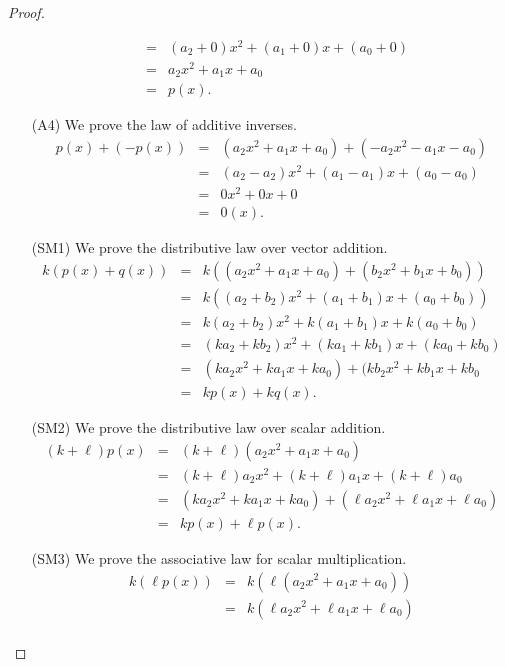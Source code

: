 \begin{proof}
\begin{itemize}
\begin{eqnarray*}
                   &=&  (a_2 + 0)x^2 + (a_1 + 0)x + (a_0 + 0) \\
                   &=&  a_2x^2 + a_1x + a_0 \\
                   &=&  p(x).
    \end{eqnarray*}
  \item[(A4)] We prove the law of additive inverses.
    \begin{eqnarray*}
      p(x) + (-p(x)) &=& (a_2x^2 + a_1x + a_0) + (- a_2x^2  - a_1x - a_0) \\
                     &=& (a_2 - a_2)x^2 + (a_1 - a_1)x + (a_0 - a_0) \\
                     &=& 0x^2 + 0x + 0 \\
                     &=& 0(x).
    \end{eqnarray*}
  \item[(SM1)] We prove the distributive law over vector addition.
    \begin{eqnarray*}
      k(p(x) + q(x)) &=& k ((a_2x^2 + a_1x + a_0) + (b_2x^2 + b_1x + b_0)) \\
                     &=& k ((a_2 + b_2)x^2 + (a_1 + b_1)x + (a_0 + b_0)) \\
                     &=& k(a_2 + b_2)x^2 + k(a_1 + b_1)x + k(a_0 + b_0) \\
                     &=& (ka_2 + kb_2)x^2 + (ka_1 + kb_1)x + (ka_0 + kb_0) \\
                     &=& (ka_2x^2 + ka_1x + ka_0) + (kb_2x^2 + kb_1x + kb_0 \\
                     &=& kp(x) + kq(x).
    \end{eqnarray*}
  \item[(SM2)] We prove the distributive law over scalar addition.
    \begin{eqnarray*}
      (k + \ell) p(x) &=& (k + \ell) (a_2x^2 + a_1x + a_0) \\
                 &=& (k + \ell)a_2x^2 + (k + \ell)a_1x + (k + \ell)a_0   \\
                 &=& (ka_2x^2 + ka_1x + ka_0) + (\ell a_2x^2 + \ell a_1x + \ell a_0) \\
                 &=& kp(x) + \ell p(x).
    \end{eqnarray*}
  \item[(SM3)] We prove the associative law for scalar multiplication.
    \begin{eqnarray*}
      k(\ell p(x)) &=& k(\ell(a_2x^2 + a_1x + a_0)) \\
               &=& k(\ell a_2x^2 + \ell a_1x + \ell a_0) \\

\end{eqnarray*}
\end{itemize}
\end{proof}
